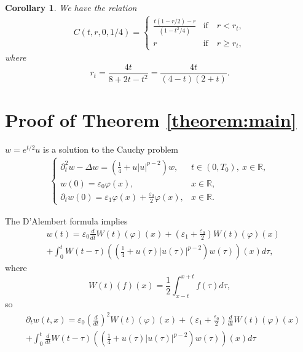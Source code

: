 \documentclass[reqno]{amsart}
\newtheorem{Corollary}[Theorem]{Corollary}
\begin{document}
\begin{Corollary}\label{c62}
We have the relation
	\begin{align}
	C(t,r,0,1/4) =
	\begin{cases}
	\frac{t(1-r/2)-r }{(1-t^2/4)}
	& \mbox{if} \quad r < r_t,\\
	r
	& \mbox{if} \quad r \geq r_t,
	\end{cases}
	\end{align}
where
	\[
	r_t
	= \frac{4t}{8+2t-t^2}
	= \frac{4t}{(4-t)(2+t)}.
	\]
\end{Corollary}

\section{Proof of Theorem \ref{theorem:main}}
$w = e^{t/2} u$ is a solution to the Cauchy problem
	\begin{align}\label{CPa1}
	\begin{cases}
	\partial_t^2 w - \Delta w = \left(\frac{1}{4} + u|u|^{p-2} \right) w,
	& t \in (0,T_0), \ x \in \mathbb R,\\
	w(0)=\varepsilon_0 \varphi(x),
	& x \in \mathbb R,\\
	\partial_t w(0) =\varepsilon_1\varphi(x)+\frac{\varepsilon_0}{2}\varphi(x),
	& x \in \mathbb R.
	\end{cases}
	\end{align}
	
The D'Alembert formula implies
\begin{align*}
    &w(t) = \varepsilon_0 \frac{d}{dt} W(t) (\varphi)(x) + \left(\varepsilon_1 + \frac{\varepsilon_0}{2} \right) W(t)(\varphi)(x)\\
    &+ \int_0^t W(t-\tau)\left( \left(\frac{1}{4}+u(\tau)|u(\tau)|^{p-2}\right) w(\tau) \right) (x) d\tau,
\end{align*}
where
	\[
	W(t)(f)(x) = \frac{1}{2} \int_{x-t}^{x+t} f(\tau) d\tau,
	\]
so
	\begin{align*}
	&\partial_t w(t,x) =  \varepsilon_0 \left(\frac{d}{dt}\right)^2 W(t) (\varphi)(x) + \left(\varepsilon_1 + \frac{\varepsilon_0}{2} \right) \frac{d}{dt} W(t)(\varphi)(x)\\
	&+ \int_0^t \frac{d}{dt} W(t-\tau)\left( \left(\frac{1}{4}+u(\tau)|u(\tau)|^{p-2}\right) w(\tau) \right) (x) d\tau
	\end{align*}
\end{document}
